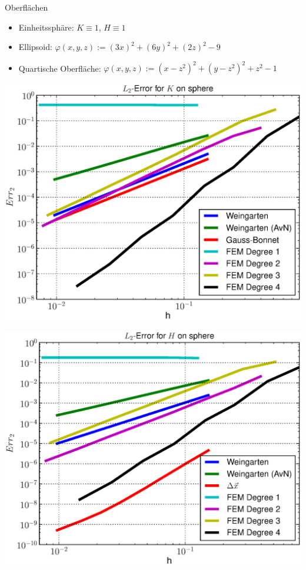 \documentclass{beamer}
\begin{document}
  \begin{frame}
    \begin{block}{Oberflächen}
      \begin{itemize}
        \item<1-> Einheitssphäre: \( K\equiv 1 \), \( H\equiv 1 \)
        \item<2-> Ellipsoid: \(  \varphi(x,y,z) := (3x)^{2} + (6y)^{2} + (2z)^{2} - 9  \)
        \item<4-> Quartische Oberfläche: \( \varphi(x,y,z) :=  (x-z^{2})^{2} + (y-z^{2})^{2} + z^{2} - 1  \)
      \end{itemize}
    \end{block}
    \vfill
    \begin{overprint}
          \begin{minipage}[t]{0.49\textwidth}
            \centering\includegraphics[width=\textwidth]{bilder/Curvature/sphere/ErrKL2.eps}
          \end{minipage}\hfill
          \begin{minipage}[t]{0.49\textwidth}
            \centering\includegraphics[width=\textwidth]{bilder/Curvature/sphere/ErrHL2.eps}

\end{minipage}
\end{overprint}
\end{frame}
\end{document}
